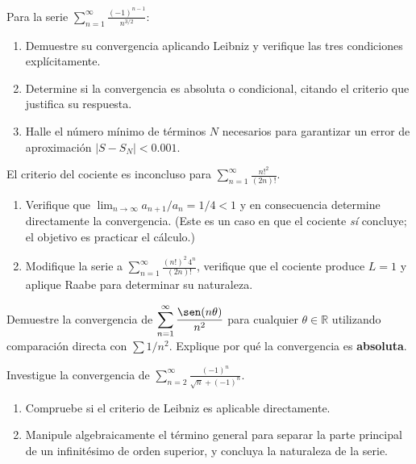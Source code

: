 \begin{prob}
Para la serie $\displaystyle\sum_{n=1}^\infty \frac{(-1)^{n-1}}{n^{3/2}}$:
\begin{enumerate}
  \item Demuestre su convergencia aplicando Leibniz y verifique las tres
        condiciones explícitamente.
  \item Determine si la convergencia es absoluta o condicional, citando
        el criterio que justifica su respuesta.
  \item Halle el número mínimo de términos $N$ necesarios para garantizar
        un error de aproximación $|S-S_N| < 0.001$.
\end{enumerate}
\end{prob}


\begin{prob}
El criterio del cociente es inconcluso para $\displaystyle\sum_{n=1}^\infty
\frac{n!^2}{(2n)!}$.
\begin{enumerate}
  \item Verifique que $\lim_{n\to\infty} a_{n+1}/a_n = 1/4 < 1$ y en
        consecuencia determine directamente la convergencia. (Este es un
        caso en que el cociente \emph{sí} concluye; el objetivo es
        practicar el cálculo.)
  \item Modifique la serie a $\displaystyle\sum_{n=1}^\infty
        \frac{(n!)^2\,4^n}{(2n)!}$, verifique que el cociente produce
        $L=1$ y aplique Raabe para determinar su naturaleza.
\end{enumerate}
\end{prob}

\begin{prob}
Demuestre la convergencia de $\displaystyle\sum_{n=1}^\infty
\frac{\sen(n\theta)}{n^2}$ para cualquier $\theta \in \mathbb{R}$
utilizando comparación directa con $\sum 1/n^2$. Explique por qué la
convergencia es \textbf{absoluta}.
\end{prob}

\begin{prob}
Investigue la convergencia de $\displaystyle\sum_{n=2}^\infty
\frac{(-1)^n}{\sqrt{n}+(-1)^n}$.
\begin{enumerate}
  \item Compruebe si el criterio de Leibniz es aplicable directamente.
  \item Manipule algebraicamente el término general para separar la parte
        principal de un infinitésimo de orden superior, y concluya la
        naturaleza de la serie.
\end{enumerate}
\end{prob}
